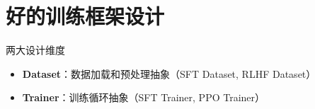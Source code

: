 \section{好的训练框架设计}
\begin{importantbox}{两大设计维度}
\begin{itemize}
  \item \textbf{Dataset}：数据加载和预处理抽象（SFT Dataset, RLHF Dataset）
  \item \textbf{Trainer}：训练循环抽象（SFT Trainer, PPO Trainer）
\end{itemize}
\end{importantbox}

